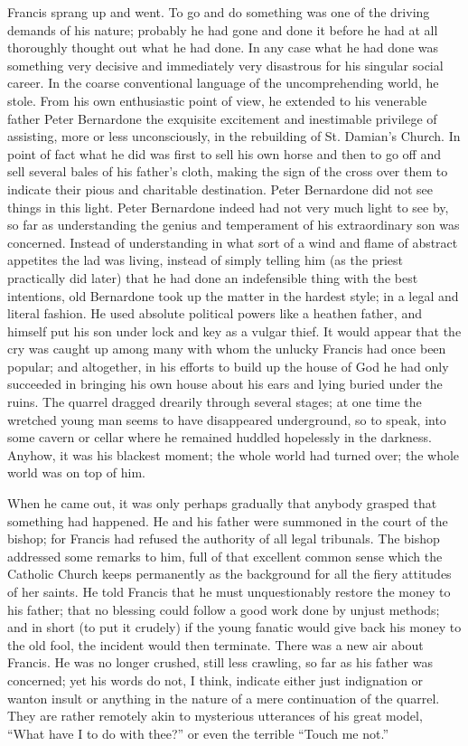 \documentclass{book}
\begin{document}
Francis sprang up and went. To go and do something was one of the driving demands of his nature; probably he had gone and done it before he had at all thoroughly thought out what he had done. In any case what he had done was something very decisive and immediately very disastrous for his singular social career. In the coarse conventional language of the uncomprehending world, he stole. From his own enthusiastic point of view, he extended to his venerable father Peter Bernardone the exquisite excitement and inestimable privilege of assisting, more or less unconsciously, in the rebuilding of St. Damian’s Church. In point of fact what he did was first to sell his own horse and then to go off and sell several bales of his father’s cloth, making the sign of the cross over them to indicate their pious and charitable destination. Peter Bernardone did not see things in this light. Peter Bernardone indeed had not very much light to see by, so far as understanding the genius and temperament of his extraordinary son was concerned. Instead of understanding in what sort of a wind and flame of abstract appetites the lad was living, instead of simply telling him (as the priest practically did later) that he had done an indefensible thing with the best intentions, old Bernardone took up the matter in the hardest style; in a legal and literal fashion. He used absolute political powers like a heathen father, and himself put his son under lock and key as a vulgar thief. It would appear that the cry was caught up among many with whom the unlucky Francis had once been popular; and altogether, in his efforts to build up the house of God he had only succeeded in bringing his own house about his ears and lying buried under the ruins. The quarrel dragged drearily through several stages; at one time the wretched young man seems to have disappeared underground, so to speak, into some cavern or cellar where he remained huddled hopelessly in the darkness. Anyhow, it was his blackest moment; the whole world had turned over; the whole world was on top of him.

When he came out, it was only perhaps gradually that anybody grasped that something had happened. He and his father were summoned in the court of the bishop; for Francis had refused the authority of all legal tribunals. The bishop addressed some remarks to him, full of that excellent common sense which the Catholic Church keeps permanently as the background for all the fiery attitudes of her saints. He told Francis that he must unquestionably restore the money to his father; that no blessing could follow a good work done by unjust methods; and in short (to put it crudely) if the young fanatic would give back his money to the old fool, the incident would then terminate. There was a new air about Francis. He was no longer crushed, still less crawling, so far as his father was concerned; yet his words do not, I think, indicate either just indignation or wanton insult or anything in the nature of a mere continuation of the quarrel. They are rather remotely akin to mysterious utterances of his great model, “What have I to do with thee?” or even the terrible “Touch me not.”
\end{document}
